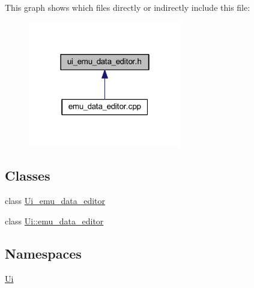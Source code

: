This graph shows which files directly or indirectly include this file\+:
\nopagebreak
\begin{figure}[H]
\begin{center}
\leavevmode
\includegraphics[width=190pt]{dd/d56/a00274}
\end{center}
\end{figure}
\subsection*{Classes}
\begin{DoxyCompactItemize}
\item 
class \hyperlink{a00026}{Ui\+\_\+emu\+\_\+data\+\_\+editor}
\item 
class \hyperlink{a00005}{Ui\+::emu\+\_\+data\+\_\+editor}
\end{DoxyCompactItemize}
\subsection*{Namespaces}
\begin{DoxyCompactItemize}
\item 
 \hyperlink{a00055}{Ui}
\end{DoxyCompactItemize}
